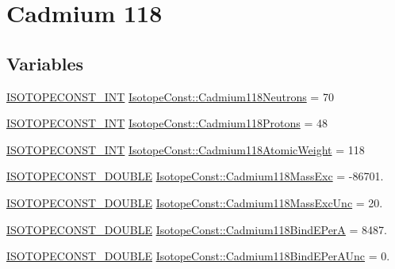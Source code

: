 \hypertarget{group___isotope_const-_cadmium-_cd118}{}\section{Cadmium 118}
\label{group___isotope_const-_cadmium-_cd118}
\subsection*{Variables}
\begin{DoxyCompactItemize}
\item 
\mbox{\hyperlink{group___isotope_const-_macros_ga5f18360b3e99483a35c32d789e62621c}{I\+S\+O\+T\+O\+P\+E\+C\+O\+N\+S\+T\+\_\+\+I\+NT}} \mbox{\hyperlink{group___isotope_const-_cadmium-_cd118_gacbf6d269852ccb3c37b4e5331d81ea37}{Isotope\+Const\+::\+Cadmium118\+Neutrons}} = 70
\item 
\mbox{\hyperlink{group___isotope_const-_macros_ga5f18360b3e99483a35c32d789e62621c}{I\+S\+O\+T\+O\+P\+E\+C\+O\+N\+S\+T\+\_\+\+I\+NT}} \mbox{\hyperlink{group___isotope_const-_cadmium-_cd118_ga9e19378a5d8c93decc2a419f66896148}{Isotope\+Const\+::\+Cadmium118\+Protons}} = 48
\item 
\mbox{\hyperlink{group___isotope_const-_macros_ga5f18360b3e99483a35c32d789e62621c}{I\+S\+O\+T\+O\+P\+E\+C\+O\+N\+S\+T\+\_\+\+I\+NT}} \mbox{\hyperlink{group___isotope_const-_cadmium-_cd118_ga8fe91adae899cd13400ec469ad4dad66}{Isotope\+Const\+::\+Cadmium118\+Atomic\+Weight}} = 118
\item 
\mbox{\hyperlink{group___isotope_const-_macros_ga8f45a7272ce02c0b4c65c44636ed719a}{I\+S\+O\+T\+O\+P\+E\+C\+O\+N\+S\+T\+\_\+\+D\+O\+U\+B\+LE}} \mbox{\hyperlink{group___isotope_const-_cadmium-_cd118_ga7347fa29c9cb67124bc735efab895403}{Isotope\+Const\+::\+Cadmium118\+Mass\+Exc}} = -\/86701.
\item 
\mbox{\hyperlink{group___isotope_const-_macros_ga8f45a7272ce02c0b4c65c44636ed719a}{I\+S\+O\+T\+O\+P\+E\+C\+O\+N\+S\+T\+\_\+\+D\+O\+U\+B\+LE}} \mbox{\hyperlink{group___isotope_const-_cadmium-_cd118_ga8d18d73063983b80d1a0fcf1213bad87}{Isotope\+Const\+::\+Cadmium118\+Mass\+Exc\+Unc}} = 20.
\item 
\mbox{\hyperlink{group___isotope_const-_macros_ga8f45a7272ce02c0b4c65c44636ed719a}{I\+S\+O\+T\+O\+P\+E\+C\+O\+N\+S\+T\+\_\+\+D\+O\+U\+B\+LE}} \mbox{\hyperlink{group___isotope_const-_cadmium-_cd118_ga040b2bf7c51d0b57a084d385696cfe2a}{Isotope\+Const\+::\+Cadmium118\+Bind\+E\+PerA}} = 8487.
\item 
\mbox{\hyperlink{group___isotope_const-_macros_ga8f45a7272ce02c0b4c65c44636ed719a}{I\+S\+O\+T\+O\+P\+E\+C\+O\+N\+S\+T\+\_\+\+D\+O\+U\+B\+LE}} \mbox{\hyperlink{group___isotope_const-_cadmium-_cd118_ga0ff80ce45fec83a9952e9ca76474f71d}{Isotope\+Const\+::\+Cadmium118\+Bind\+E\+Per\+A\+Unc}} = 0.

\end{DoxyCompactItemize}
